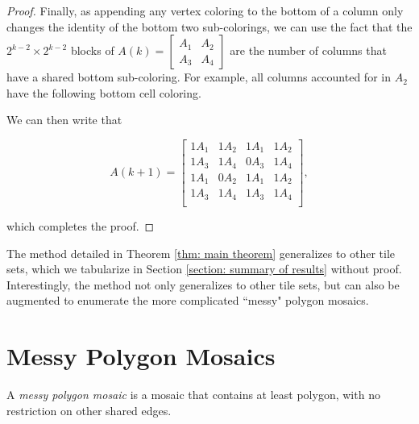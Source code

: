 \documentclass[12pt]{article}
\theoremstyle{plain}
\theoremstyle{definition}
\theoremstyle{remark}
\theoremstyle{definition}
\newcommand{\cell}[4]{ \draw[thick] ( #1 , #2 ) rectangle ( #3 , #4 );}
\begin{document}
\begin{proof}
Finally, as appending any vertex coloring to the bottom of a column only changes the identity of the bottom two sub-colorings, we can use the fact that the $2^{k-2} \times 2^{k-2}$ blocks of $A(k) = \begin{bmatrix} A_1 & A_2 \\ A_3 & A_4 \end{bmatrix}$ are the number of columns that have a shared bottom sub-coloring. For example, all columns accounted for in $A_2$ have the following bottom cell coloring.

\begin{center}
\end{center}

We can then write that

$$
A(k+1) = 
\begin{bmatrix}
    1A_1 & 1A_2 & 1A_1 & 1A_2 \\
    1A_3 & 1A_4 & 0A_3 & 1A_4 \\
    1A_1 & 0A_2 & 1A_1 & 1A_2 \\
    1A_3 & 1A_4 & 1A_3 & 1A_4 \\
\end{bmatrix},
$$

which completes the proof.

\end{proof}

The method detailed in Theorem \ref{thm: main theorem} generalizes to other tile sets, which we tabularize in Section \ref{section: summary of results} without proof. Interestingly, the method not only generalizes to other tile sets, but can also be augmented to enumerate the more complicated ``messy" polygon mosaics.

\section{Messy Polygon Mosaics}

A \textit{messy polygon mosaic} is a mosaic that contains at least polygon, with no restriction on other shared edges. 
\end{document}
